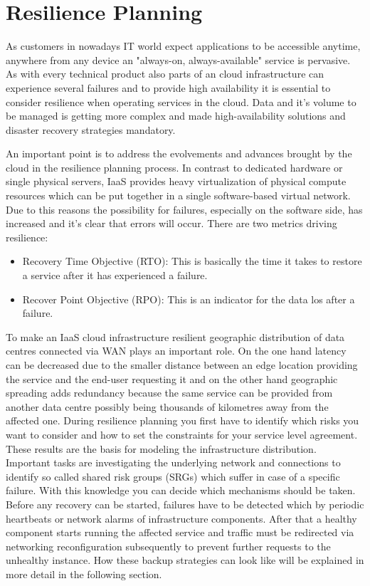 \section{Resilience Planning}
As customers in nowadays IT world expect applications to be accessible anytime, anywhere from any device an "always-on, always-available" service is pervasive. As with every technical product also parts of an cloud infrastructure can experience several failures and to provide high availability it is essential to consider resilience when operating services in the cloud. \cite{IBM_2014} Data and it's volume to be managed is getting more complex  and made high-availability solutions and disaster recovery strategies mandatory. 

An important point is to address the evolvements and advances brought by the cloud in the resilience planning process. In contrast to dedicated hardware or single physical servers, IaaS provides heavy virtualization of physical compute resources which can be put together in a single software-based virtual network. Due to this reasons the possibility for failures, especially on the software side, has increased and it's clear that errors will occur. \cite{IBM_2014}  
There are two metrics driving resilience:
\begin{itemize}
	\itemsep0em 
	\item Recovery Time Objective (RTO): This is basically the time it takes to restore a service after it has experienced a failure.
	\item Recover Point Objective (RPO): This is an indicator for the data los after a failure.
\end{itemize}

To make an IaaS cloud infrastructure resilient geographic distribution of data centres connected via WAN plays an important role. On the one hand latency can be decreased due to the smaller distance between an edge location providing the service and the end-user requesting it and on the other hand geographic spreading adds redundancy because the same service can be provided from another data centre possibly being thousands of kilometres away from the affected one. 
During resilience planning you first have to identify which risks you want to consider and how to set the constraints for your service level agreement. These results are the basis for modeling the infrastructure distribution. Important tasks are investigating the underlying network and connections to identify so called shared risk groups (SRGs) which suffer in case of a specific failure. With this knowledge you can decide which mechanisms should be taken. Before any recovery can be started, failures have to be detected which by periodic heartbeats or network alarms of infrastructure components. After that a healthy component starts running the affected service and traffic must be redirected via networking reconfiguration subsequently to prevent further requests to the unhealthy instance. \cite{Resilience_2014} How these backup strategies can look like will be explained in more detail in the following section. 

